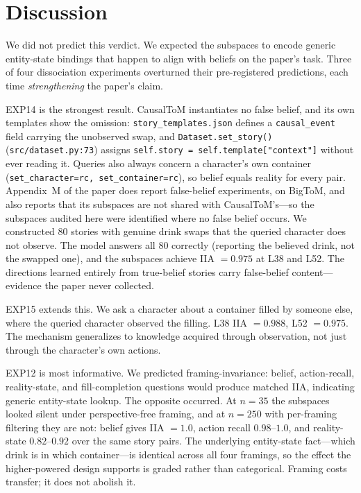\documentclass{article}
\begin{document}
\section{Discussion}
\label{sec:discussion}

We did not predict this verdict. We expected the subspaces to encode generic entity-state bindings that happen to align with beliefs on the paper's task. Three of four dissociation experiments overturned their pre-registered predictions, each time \emph{strengthening} the paper's claim.

EXP14 is the strongest result. CausalToM instantiates no false belief, and its own templates show the omission: \texttt{story\_templates.json} defines a \texttt{causal\_event} field carrying the unobserved swap, and \texttt{Dataset.set\_story()} (\texttt{src/dataset.py:73}) assigns \texttt{self.story = self.template["context"]} without ever reading it. Queries also always concern a character's own container (\texttt{set\_character=rc, set\_container=rc}), so belief equals reality for every pair. Appendix~M of the paper does report false-belief experiments, on BigToM, and also reports that its subspaces are not shared with CausalToM's---so the subspaces audited here were identified where no false belief occurs. We constructed 80 stories with genuine drink swaps that the queried character does not observe. The model answers all 80 correctly (reporting the believed drink, not the swapped one), and the subspaces achieve IIA $= 0.975$ at L38 and L52. The directions learned entirely from true-belief stories carry false-belief content---evidence the paper never collected.

EXP15 extends this. We ask a character about a container filled by someone else, where the queried character observed the filling. L38 IIA $= 0.988$, L52 $= 0.975$. The mechanism generalizes to knowledge acquired through observation, not just through the character's own actions.

EXP12 is most informative. We predicted framing-invariance: belief, action-recall, reality-state, and fill-completion questions would produce matched IIA, indicating generic entity-state lookup. The opposite occurred. At $n = 35$ the subspaces looked silent under perspective-free framing, and at $n = 250$ with
per-framing filtering they are not: belief gives IIA $= 1.0$, action recall $0.98$--$1.0$, and
reality-state $0.82$--$0.92$ over the same story pairs. The underlying entity-state
fact---which drink is in which container---is identical across all four framings, so the
effect the higher-powered design supports is graded rather than categorical. Framing costs
transfer; it does not abolish it.
\end{document}
